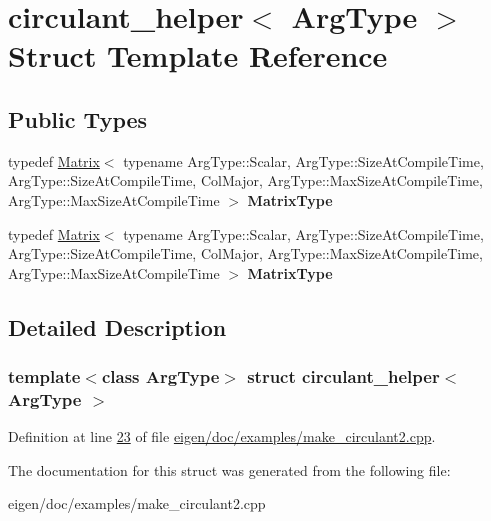 \hypertarget{structcirculant__helper}{}\section{circulant\+\_\+helper$<$ Arg\+Type $>$ Struct Template Reference}
\label{structcirculant__helper}
\subsection*{Public Types}
\begin{DoxyCompactItemize}
\item 
\mbox{\label{structcirculant__helper_a9a6062821a16c663e7919897115bf7b2}} 
typedef \hyperlink{group___core___module_class_eigen_1_1_matrix}{Matrix}$<$ typename Arg\+Type\+::\+Scalar, Arg\+Type\+::\+Size\+At\+Compile\+Time, Arg\+Type\+::\+Size\+At\+Compile\+Time, Col\+Major, Arg\+Type\+::\+Max\+Size\+At\+Compile\+Time, Arg\+Type\+::\+Max\+Size\+At\+Compile\+Time $>$ {\bfseries Matrix\+Type}
\item 
\mbox{\label{structcirculant__helper_a9a6062821a16c663e7919897115bf7b2}} 
typedef \hyperlink{group___core___module_class_eigen_1_1_matrix}{Matrix}$<$ typename Arg\+Type\+::\+Scalar, Arg\+Type\+::\+Size\+At\+Compile\+Time, Arg\+Type\+::\+Size\+At\+Compile\+Time, Col\+Major, Arg\+Type\+::\+Max\+Size\+At\+Compile\+Time, Arg\+Type\+::\+Max\+Size\+At\+Compile\+Time $>$ {\bfseries Matrix\+Type}
\end{DoxyCompactItemize}


\subsection{Detailed Description}
\subsubsection*{template$<$class Arg\+Type$>$\newline
struct circulant\+\_\+helper$<$ Arg\+Type $>$}



Definition at line \hyperlink{eigen_2doc_2examples_2make__circulant2_8cpp_source_l00023}{23} of file \hyperlink{eigen_2doc_2examples_2make__circulant2_8cpp_source}{eigen/doc/examples/make\+\_\+circulant2.\+cpp}.



The documentation for this struct was generated from the following file\+:\begin{DoxyCompactItemize}
\item 
eigen/doc/examples/make\+\_\+circulant2.\+cpp\end{DoxyCompactItemize}
